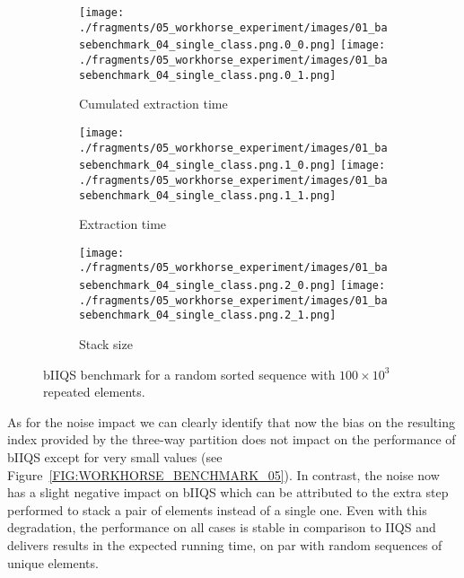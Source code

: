 \begin{figure}
    \centering
    \begin{subfigure}[b]{\textwidth}
        \centering
        \texttt{[image: ./fragments/05\_workhorse\_experiment/images/01\_basebenchmark\_04\_single\_class.png.0\_0.png]}
        \texttt{[image: ./fragments/05\_workhorse\_experiment/images/01\_basebenchmark\_04\_single\_class.png.0\_1.png]}
        \caption{Cumulated extraction time}
        \label{FIG:WORKHORSE_BENCHMARK_04__0_0}
    \end{subfigure}

    \begin{subfigure}[b]{\textwidth}
        \centering
        \texttt{[image: ./fragments/05\_workhorse\_experiment/images/01\_basebenchmark\_04\_single\_class.png.1\_0.png]}
        \texttt{[image: ./fragments/05\_workhorse\_experiment/images/01\_basebenchmark\_04\_single\_class.png.1\_1.png]}
        \caption{Extraction time}
        \label{FIG:WORKHORSE_BENCHMARK_04__0_1}
    \end{subfigure}

    \begin{subfigure}[b]{\textwidth}
        \centering
        \texttt{[image: ./fragments/05\_workhorse\_experiment/images/01\_basebenchmark\_04\_single\_class.png.2\_0.png]}
        \texttt{[image: ./fragments/05\_workhorse\_experiment/images/01\_basebenchmark\_04\_single\_class.png.2\_1.png]}
        \caption{Stack size}
        \label{FIG:WORKHORSE_BENCHMARK_04__0_2}
    \end{subfigure}
    
    \caption{bIIQS benchmark for a random sorted sequence with $100\times10^3$ repeated elements.}
    \label{FIG:WORKHORSE_BENCHMARK_04}
\end{figure}


As for the noise impact we can clearly identify that now the bias on the resulting index provided by the three-way partition does not impact on the performance of bIIQS except for very small values (see Figure~\ref{FIG:WORKHORSE_BENCHMARK_05}). In contrast, the noise now has a slight negative impact on bIIQS which can be attributed to the extra step performed to stack a pair of elements instead of a single one. Even with this degradation, the performance on all cases is stable in comparison to IIQS and delivers results in the expected running time, on par with random sequences of unique elements.\\


